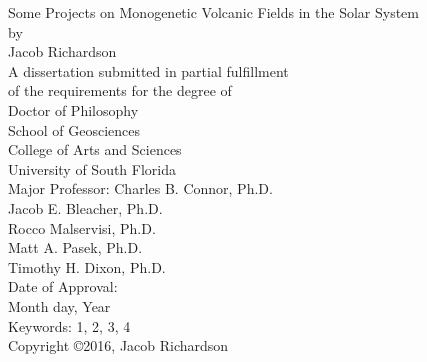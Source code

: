 \begin{titlepage}
\begin{center}
\singlespacing
{ \vspace*{\baselineskip} }
{ \vspace*{\baselineskip} }
{ \vspace*{\baselineskip} }
{ \vspace*{\baselineskip} }
Some Projects on Monogenetic Volcanic Fields in the Solar System\\
{ \vspace*{\baselineskip} }
{ \vspace*{\baselineskip} }
{ \vspace*{\baselineskip} }
by\\
{ \vspace*{\baselineskip} }
{ \vspace*{\baselineskip} }
{ \vspace*{\baselineskip} }
Jacob Richardson\\
{ \vspace*{\baselineskip} }
{ \vspace*{\baselineskip} }
{ \vspace*{\baselineskip} }
{ \vspace*{\baselineskip} }
A dissertation submitted in partial fulfillment\\
of the requirements for the degree of\\
Doctor of Philosophy\\
School of Geosciences\\
College of Arts and Sciences\\
University of South Florida\\
{ \vspace*{\baselineskip} }
{ \vspace*{\baselineskip} }
{ \vspace*{\baselineskip} }
Major Professor: Charles B. Connor, Ph.D.\\
Jacob E. Bleacher, Ph.D.\\
Rocco Malservisi, Ph.D.\\
Matt A. Pasek, Ph.D.\\
Timothy H. Dixon, Ph.D.\\
{ \vspace*{\baselineskip} }
{ \vspace*{\baselineskip} }
Date of Approval:\\
Month day, Year\\
{ \vspace*{\baselineskip} }
{ \vspace*{\baselineskip} }
{ \vspace*{\baselineskip} }
Keywords: 1, 2, 3, 4\\
{ \vspace*{\baselineskip} }
Copyright \copyright\hspace{1mm}2016, Jacob Richardson\\
\end{center}
\end{titlepage}
